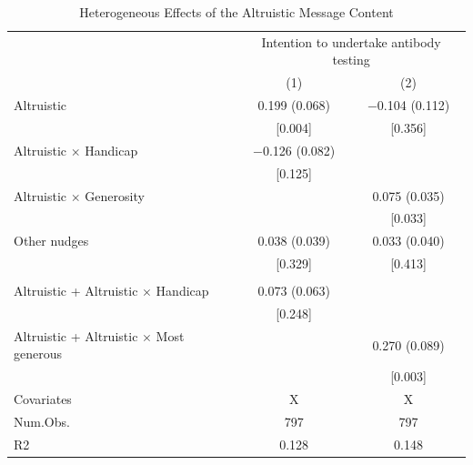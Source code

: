 \documentclass[
    a4paper
]{article}
\begin{document}
\begin{table}

\caption{\label{tab:reg-mechanism}Heterogeneous Effects of the Altruistic Message Content}
\centering
\fontsize{9}{11}\selectfont
\begin{threeparttable}
\begin{tabular}[t]{lcc}
\toprule
\multicolumn{1}{c}{ } & \multicolumn{2}{c}{Intention to undertake antibody testing} \\
\cmidrule(l{3pt}r{3pt}){2-3}
  & (1) & (2)\\
\midrule
Altruistic & \num{0.199} (\num{0.068}) & \num{-0.104} (\num{0.112})\\
 & {}[\num{0.004}] & {}[\num{0.356}]\\
Altruistic $\times$ Handicap & \num{-0.126} (\num{0.082}) & \\
 & {}[\num{0.125}] & \\
Altruistic $\times$ Generosity &  & \num{0.075} (\num{0.035})\\
 &  & {}[\num{0.033}]\\
Other nudges & \num{0.038} (\num{0.039}) & \num{0.033} (\num{0.040})\\
 & {}[\num{0.329}] & {}[\num{0.413}]\\
\addlinespace[0.3em]
\multicolumn{3}{l}{\textbf{Linear combination test}}\\
\hspace{1em}Altruistic + Altruistic $\times$ Handicap & \num{0.073} (\num{0.063}) & \\
\hspace{1em} & {}[\num{0.248}] & \\
\hspace{1em}Altruistic + Altruistic $\times$ Most generous &  & \num{0.270} (\num{0.089})\\
\hspace{1em} &  & {}[\num{0.003}]\\
\midrule
Covariates & X & X\\
Num.Obs. & \num{797} & \num{797}\\
R2 & \num{0.128} & \num{0.148}\\
\bottomrule
\end{tabular}
\begin{tablenotes}

\end{tablenotes}
\end{threeparttable}
\end{table}
\end{document}
